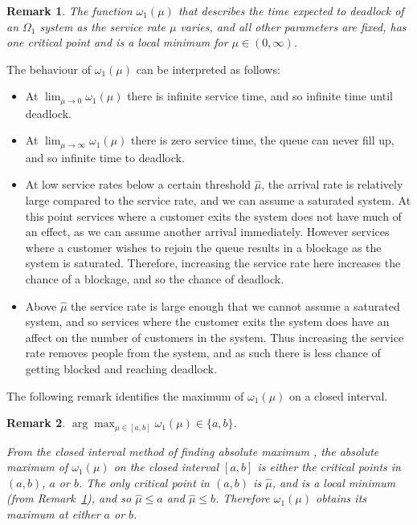 \documentclass{article}
\newtheorem{remark}{Remark}
\numberwithin{equation}{section}
\begin{document}
\begin{remark}\label{rem:oneminima}
The function $\omega_1(\mu)$ that describes the time expected to deadlock of an $\Omega_1$ system as the service rate $\mu$ varies, and all other parameters are fixed, has one critical point and is a local minimum for $\mu \in (0, \infty)$.
\end{remark}

The behaviour of $\omega_1(\mu)$ can be interpreted as follows:
\begin{itemize}
\item At $\lim_{\mu \to 0} \omega_1 (\mu)$ there is infinite service time, and so infinite time until deadlock.
\item At $\lim_{\mu \to \infty} \omega_1 (\mu)$ there is zero service time, the queue can never fill up, and so infinite time to deadlock.
\item At low service rates below a certain threshold $\hat{\mu}$, the arrival rate is relatively large compared to the service rate, and we can assume a saturated system.
At this point services where a customer exits the system does not have much of an effect, as we can assume another arrival immediately.
However services where a customer wishes to rejoin the queue results in a blockage as the system is saturated.
Therefore, increasing the service rate here increases the chance of a blockage, and so the chance of deadlock.
\item Above $\hat{\mu}$ the service rate is large enough that we cannot assume a saturated system, and so services where the customer exits the system does have an affect on the number of customers in the system.
Thus increasing the service rate removes people from the system, and as such there is less chance of getting blocked and reaching deadlock.
\end{itemize}

The following remark identifies the maximum of $\omega_1(\mu)$ on a closed interval.\\

\begin{remark}\label{rem:findmaximum}
$\arg\max_{\mu \in [a, b]} \omega_1(\mu) \in \{a, b\}$.

From the closed interval method of finding absolute maximum \cite{tan09}, the absolute maximum of $\omega_1(\mu)$ on the closed interval $[a, b]$ is either the critical points in $(a, b)$, $a$ or $b$.
The only critical point in $(a, b)$ is $\hat{\mu}$, and is a local minimum (from Remark~\ref{rem:oneminima}), and so $\hat{\mu} \leq a$ and $\hat{\mu} \leq b$.
Therefore $\omega_1(\mu)$ obtains its maximum at either $a$ or $b$.
\end{remark}
\end{document}
